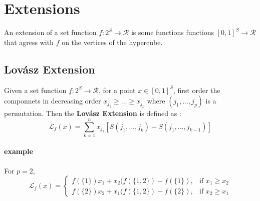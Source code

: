\documentclass[options]{article}
\theoremstyle{definition}
\begin{document}
\section{Extensions}
An extension of a set function $f: 2^S \rightarrow \mathcal{R}$ is some functions functions $[0,1]^S \rightarrow \mathcal{R}$ that agress with $f$ on the vertices of the hypercube.
\subsection{Lov{\'a}sz Extension}
Given a set function $f: 2^S \rightarrow \mathcal{R}$, for a point $ x \in [0,1]^S$, first order the componnets in decreasing order $x_{j_1} \geq ...\geq x_{j_p}$ where $(j_1,...,j_p)$ is a permutation. Then the \textbf{Lov{\'a}sz Extension} is defined as :
\[
\mathcal{L}_f (x) = \sum_{k=1}^n x_{j_k} [S({j_1,...,j_k}) - S({j_1,...,j_{k-1}})]
\]
\paragraph{example} 
For $p=2$,
\[
\mathcal{L}_f (x)=\begin{cases}
   f(\{1\})x_1+ x_2(f(\{1,2\})- f(\{1\}),& \text{if } x_1 \geq x_2\\
     f(\{2\})x_2+ x_1(f(\{1,2\})- f(\{2\}),& \text{if } x_2 \geq x_1
\end{cases}
\] 
\end{document}
